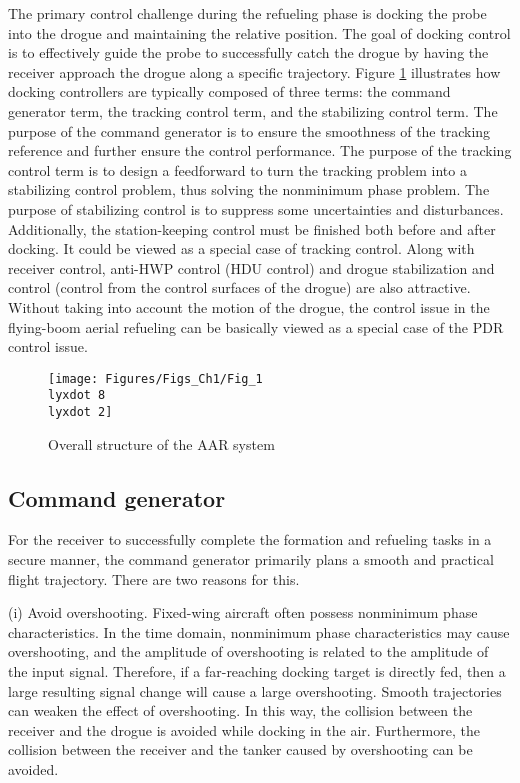The primary control challenge during the refueling phase is docking
the probe into the drogue and maintaining the relative position. The
goal of docking control is to effectively guide the probe to successfully
catch the drogue by having the receiver approach the drogue along
a specific trajectory. Figure \ref{Fig_1.8-2} illustrates how docking
controllers are typically composed of three terms: the command generator
term, the tracking control term, and the stabilizing control term.
The purpose of the command generator is to ensure the smoothness of
the tracking reference and further ensure the control performance.
The purpose of the tracking control term is to design a feedforward
to turn the tracking problem into a stabilizing control problem, thus
solving the nonminimum phase problem. The purpose of stabilizing control
is to suppress some uncertainties and disturbances. Additionally,
the station-keeping control must be finished both before and after
docking. It could be viewed as a special case of tracking control.
Along with receiver control, anti-HWP control (HDU control) and drogue
stabilization and control (control from the control surfaces of the
drogue) are also attractive. Without taking into account the motion
of the drogue, the control issue in the flying-boom aerial refueling
can be basically viewed as a special case of the PDR control issue.
\begin{figure}
\begin{centering}
\texttt{[image: Figures/Figs\_Ch1/Fig\_1\\lyxdot 8\\lyxdot 2]}
\par\end{centering}
\caption{Overall structure of the AAR system}

\centering{}\label{Fig_1.8-2}
\end{figure}


\subsection{Command generator}

For the receiver to successfully complete the formation and refueling
tasks in a secure manner, the command generator primarily plans a
smooth and practical flight trajectory. There are two reasons for
this.

(i) Avoid overshooting. Fixed-wing aircraft often possess nonminimum
phase characteristics. In the time domain, nonminimum phase characteristics
may cause overshooting, and the amplitude of overshooting is related
to the amplitude of the input signal. Therefore, if a far-reaching
docking target is directly fed, then a large resulting signal change
will cause a large overshooting. Smooth trajectories can weaken the
effect of overshooting. In this way, the collision between the receiver
and the drogue is avoided while docking in the air. Furthermore, the
collision between the receiver and the tanker caused by overshooting
can be avoided.

